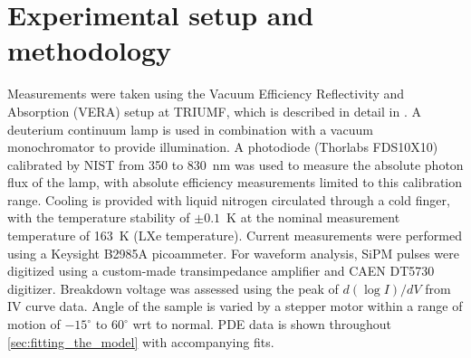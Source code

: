 

\section{Experimental setup and methodology}
\label{sec:experimental}
Measurements were taken using the Vacuum Efficiency Reflectivity and Absorption (VERA) setup at TRIUMF, which is described in detail in \cite{Lewis_2025_qy}. A deuterium continuum lamp is used in combination with a vacuum monochromator to provide illumination. A photodiode (Thorlabs FDS10X10) calibrated by NIST from 350 to 830~nm was used to measure the absolute photon flux of the lamp, with absolute efficiency measurements limited to this calibration range. Cooling is provided with liquid nitrogen circulated through a cold finger, with the temperature stability of $\pm 0.1$~K at the nominal measurement temperature of 163~K (LXe temperature). Current measurements were performed using a Keysight B2985A picoammeter. For waveform analysis, SiPM pulses were digitized using a custom-made transimpedance amplifier and CAEN DT5730 digitizer. Breakdown voltage was assessed using the peak of $d(\log{I})/dV$ from IV curve data. Angle of the sample is varied by a stepper motor within a range of motion of $-15^{\circ}$ to $60^{\circ}$ wrt to normal. PDE data is shown throughout \autoref{sec:fitting_the_model} with accompanying fits.

